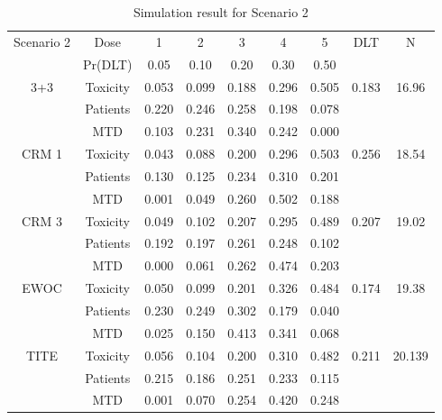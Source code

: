 \documentclass[12pt]{article}
\begin{document}
\begin{table}[H] \label{tblScn2}
  \centering
  \begin{tabular}{|cc|c|c|c|c|c|c|c|} 
    \hline
    Scenario 2 & Dose & 1 & 2 & 3 & 4 & 5 & DLT & N \\
               & Pr(DLT) & 0.05 & 0.10 & 0.20 & 0.30 & 0.50 & & \\
    \hline
    3+3 & Toxicity & 0.053 & 0.099 & 0.188 & 0.296 & 0.505 & 0.183 & 16.96 \\
               & Patients & 0.220 & 0.246 & 0.258 & 0.198 & 0.078 & & \\
               & MTD & 0.103 & 0.231 & 0.340 & 0.242 & 0.000 & & \\
    \hline
    CRM 1 & Toxicity & 0.043 & 0.088 & 0.200 & 0.296 & 0.503 & 0.256 & 18.54 \\
               & Patients & 0.130 & 0.125 & 0.234 & 0.310 & 0.201 & & \\
               & MTD & 0.001 & 0.049 & 0.260 & 0.502 & 0.188 & & \\
    \hline
    CRM 3 & Toxicity & 0.049 & 0.102 & 0.207 & 0.295 & 0.489 & 0.207 & 19.02 \\
               & Patients & 0.192 & 0.197 & 0.261 & 0.248 & 0.102 & & \\
               & MTD & 0.000 & 0.061 & 0.262 & 0.474 & 0.203 & & \\
    \hline
    EWOC & Toxicity & 0.050 & 0.099 & 0.201 & 0.326 & 0.484 & 0.174 & 19.38 \\
               & Patients & 0.230 & 0.249 & 0.302 & 0.179 & 0.040 & & \\
               & MTD & 0.025 & 0.150 & 0.413 & 0.341 & 0.068 & & \\
    \hline
    TITE & Toxicity & 0.056 & 0.104 & 0.200 & 0.310 & 0.482 & 0.211 & 20.139 \\
               & Patients & 0.215 & 0.186 & 0.251 & 0.233 & 0.115 & & \\
               & MTD & 0.001 & 0.070 & 0.254 & 0.420 & 0.248 & & \\
    \hline
  \end{tabular}
  \caption{Simulation result for Scenario 2}
\end{table}
\end{document}
